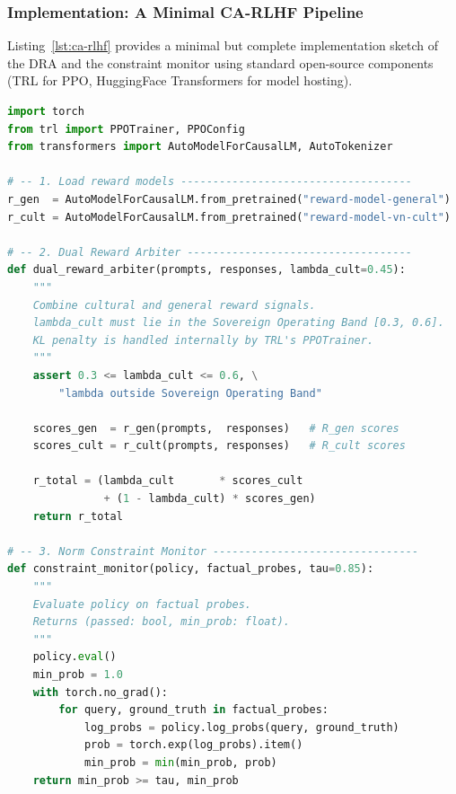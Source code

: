 \subsubsection{Implementation: A Minimal CA-RLHF Pipeline}
\label{subsubsec:ca-rlhf-impl}

Listing~\ref{lst:ca-rlhf} provides a minimal but complete
implementation sketch of the DRA and the constraint monitor
using standard open-source components (TRL for PPO,
HuggingFace Transformers for model hosting).

\begin{lstlisting}[language=Python, style=pythonstyle,
  caption={Minimal CA-RLHF pipeline: Dual Reward Arbiter and
           Norm Constraint Monitor.},
  label={lst:ca-rlhf}
]
import torch
from trl import PPOTrainer, PPOConfig
from transformers import AutoModelForCausalLM, AutoTokenizer

# -- 1. Load reward models ------------------------------------
r_gen  = AutoModelForCausalLM.from_pretrained("reward-model-general")
r_cult = AutoModelForCausalLM.from_pretrained("reward-model-vn-cult")

# -- 2. Dual Reward Arbiter -----------------------------------
def dual_reward_arbiter(prompts, responses, lambda_cult=0.45):
    """
    Combine cultural and general reward signals.
    lambda_cult must lie in the Sovereign Operating Band [0.3, 0.6].
    KL penalty is handled internally by TRL's PPOTrainer.
    """
    assert 0.3 <= lambda_cult <= 0.6, \
        "lambda outside Sovereign Operating Band"

    scores_gen  = r_gen(prompts,  responses)   # R_gen scores
    scores_cult = r_cult(prompts, responses)   # R_cult scores

    r_total = (lambda_cult       * scores_cult
               + (1 - lambda_cult) * scores_gen)
    return r_total

# -- 3. Norm Constraint Monitor --------------------------------
def constraint_monitor(policy, factual_probes, tau=0.85):
    """
    Evaluate policy on factual probes.
    Returns (passed: bool, min_prob: float).
    """
    policy.eval()
    min_prob = 1.0
    with torch.no_grad():
        for query, ground_truth in factual_probes:
            log_probs = policy.log_probs(query, ground_truth)
            prob = torch.exp(log_probs).item()
            min_prob = min(min_prob, prob)
    return min_prob >= tau, min_prob


\end{lstlisting}
